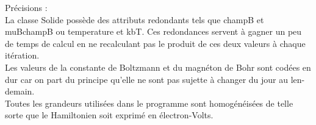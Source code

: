 Précisions :\\
La classe Solide possède des attributs redondants tels que champB et muBchampB ou temperature et kbT. Ces redondances servent à gagner un peu de temps de calcul en ne recalculant pas le produit de ces deux valeurs à chaque itération.\\
Les valeurs de la constante de Boltzmann et du magnéton de Bohr sont codées en dur car on part du principe qu'elle ne sont pas sujette à changer du jour au len-demain.\\
Toutes les grandeurs utilisées dans le programme sont homogénéisées de telle sorte que le Hamiltonien soit exprimé en électron-Volts.

